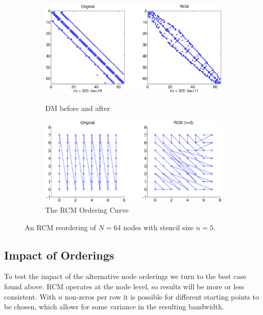 \documentclass{report}
\begin{document}
\begin{figure}
\centering
\begin{subfigure}{12.5cm}
\centering
\includegraphics[width=\textwidth]{rbffd_methods_content/hashing/rcm_example_dm.eps} 
\label{fig:rcm_dm_before_after}
\caption{DM before and after}
\end{subfigure}
\begin{subfigure}{12.5cm}
\centering
\includegraphics[width=\textwidth]{rbffd_methods_content/hashing/node_ordering_rcm_n5.eps} 
\caption{The RCM Ordering Curve}
\label{fig:rcm_curve}
\end{subfigure}
\caption{An RCM reordering of $N=64$ nodes with stencil size $n=5$.}
\label{fig:rcm_example}
\end{figure}




\subsection{Impact of Orderings}

To test the impact of the alternative node orderings we turn to the best case found above. RCM operates at the node level, so results will be more or less consistent. With $n$ non-zeros per row it is possible for different starting points to be chosen, which allows for some variance in the resulting bandwidth. 
\end{document}
